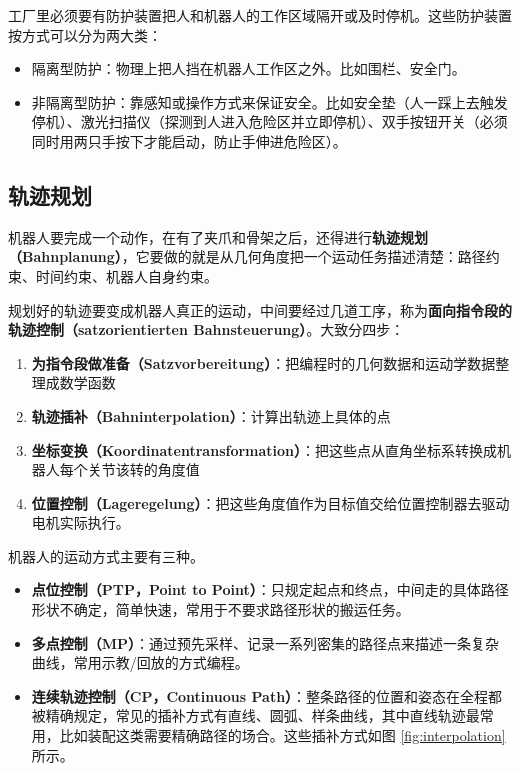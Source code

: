 工厂里必须要有防护装置把人和机器人的工作区域隔开或及时停机。这些防护装置按方式可以分为两大类：
\begin{itemize}
    \item 隔离型防护：物理上把人挡在机器人工作区之外。比如围栏、安全门。
    \item 非隔离型防护：靠感知或操作方式来保证安全。比如安全垫（人一踩上去触发停机）、激光扫描仪（探测到人进入危险区并立即停机）、双手按钮开关（必须同时用两只手按下才能启动，防止手伸进危险区）。
\end{itemize}

\subsection{轨迹规划}

机器人要完成一个动作，在有了夹爪和骨架之后，还得进行\textbf{轨迹规划（Bahnplanung）}，它要做的就是从几何角度把一个运动任务描述清楚：路径约束、时间约束、机器人自身约束。

规划好的轨迹要变成机器人真正的运动，中间要经过几道工序，称为\textbf{面向指令段的轨迹控制（satzorientierten Bahnsteuerung）}。大致分四步：
\begin{enumerate}
    \item \textbf{为指令段做准备（Satzvorbereitung）}：把编程时的几何数据和运动学数据整理成数学函数
    \item \textbf{轨迹插补（Bahninterpolation）}：计算出轨迹上具体的点
    \item \textbf{坐标变换（Koordinatentransformation）}：把这些点从直角坐标系转换成机器人每个关节该转的角度值
    \item \textbf{位置控制（Lageregelung）}：把这些角度值作为目标值交给位置控制器去驱动电机实际执行。
\end{enumerate}

机器人的运动方式主要有三种。
\begin{itemize}
    \item \textbf{点位控制（PTP，Point to Point）}：只规定起点和终点，中间走的具体路径形状不确定，简单快速，常用于不要求路径形状的搬运任务。
    \item \textbf{多点控制（MP）}：通过预先采样、记录一系列密集的路径点来描述一条复杂曲线，常用示教/回放的方式编程。
    \item \textbf{连续轨迹控制（CP，Continuous Path）}：整条路径的位置和姿态在全程都被精确规定，常见的插补方式有直线、圆弧、样条曲线，其中直线轨迹最常用，比如装配这类需要精确路径的场合。这些插补方式如图 \ref{fig:interpolation} 所示。
\end{itemize}

